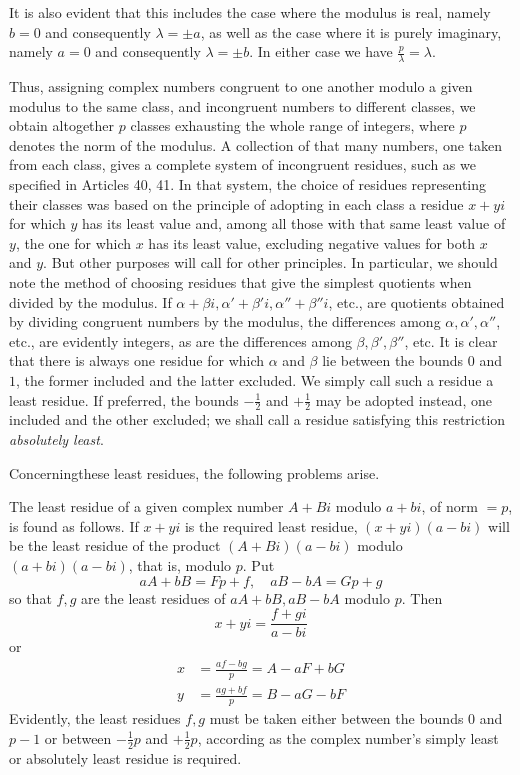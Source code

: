 It is also evident that this includes the case where the modulus is real, namely $b=0$ and consequently $\lambda=\pm a$, as well as the case where it is purely imaginary, namely $a=0$ and consequently $\lambda=\pm b$. In either case we have $\frac p\lambda=\lambda$.

%
Thus, assigning complex numbers congruent to one another modulo a given modulus to the same class, and incongruent numbers to different classes, we obtain altogether $p$ classes exhausting the whole range of integers, where $p$ denotes the norm of the modulus. A collection of that many numbers, one taken from each class, gives a complete system of incongruent residues, such as we specified in Articles 40, 41. In that system, the choice of residues representing their classes was based on the principle of adopting in each class a residue $x+yi$ for which $y$ has its least value and, among all those with that same least value of $y$, the one for which $x$ has its least value, excluding negative values for both $x$ and $y$. But other purposes will call for other principles. In particular, we should note the method of choosing residues that give the simplest quotients when divided by the modulus. If $\alpha+\beta i,\alpha'+\beta'i,\alpha''+\beta''i$, etc., are quotients obtained by dividing congruent numbers by the modulus, the differences among $\alpha,\alpha',\alpha''$, etc., are evidently integers, as are the differences among $\beta,\beta',\beta''$, etc. It is clear that there is always one residue for which $\alpha$ and $\beta$ lie between the bounds $0$ and $1$, the former included and the latter excluded. We simply call such a residue a least residue. If preferred, the bounds $-\frac12$ and $+\frac12$ may be adopted instead, one included and the other excluded; we shall call a residue satisfying this restriction \emph{absolutely least}.

Concerning\textperiodcentered these least residues, the following problems arise.

The least residue of a given complex number $A+Bi$ modulo $a+bi$, of norm $=p$, is found as follows. If $x+yi$ is the required least residue, $(x+yi)(a-bi)$ will be the least residue of the product $(A+Bi)(a-bi)$ modulo $(a+bi)(a-bi)$, that is, modulo $p$. Put
\[
aA+bB=Fp+f,\quad aB-bA=Gp+g
\]
so that $f,g$ are the least residues of $aA+bB,aB-bA$ modulo $p$. Then
%
\[
x+yi=\frac{f+gi}{a-bi}
\]
or
\[
\begin{aligned}
x&=\frac{af-bg}{p}=A-aF+bG\\
y&=\frac{ag+bf}{p}=B-aG-bF
\end{aligned}
\]
Evidently, the least residues $f,g$ must be taken either between the bounds $0$ and $p-1$ or between $-\frac12p$ and $+\frac12p$, according as the complex number's simply least or absolutely least residue is required.

